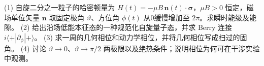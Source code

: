 (1) 自旋二分之一粒子的哈密顿量为 \(H(t)=-\mu B\,\boldsymbol n(t)\cdot\boldsymbol\sigma\)，\(\mu B>0\) 恒定，磁场单位矢量 \(\boldsymbol n\) 取固定极角 \(\vartheta\)、方位角 \(\phi(t)\) 从0缓慢增加至 \(2\pi\)。求瞬时能级及能隙。
(2) 给出沿场低能本征态的一种规范化自旋量子态，并求 Berry 连接 \(i\langle +|\partial_\phi|+\rangle\)。
(3) 求一周的几何相位和动力学相位，并将几何相位写成扫过的固角。
(4) 讨论 \(\vartheta\to0\)、\(\vartheta\to\pi/2\) 两极限以及绝热条件；说明相位为何可在干涉实验中观测。
